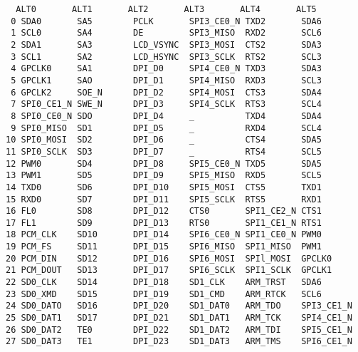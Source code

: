 \begingroup \fontsize{10pt}{10pt}
\selectfont
\begin{verbatim} 
  ALT0       ALT1       ALT2       ALT3       ALT4       ALT5      
 0 SDA0       SA5        PCLK       SPI3_CE0_N TXD2       SDA6      
 1 SCL0       SA4        DE         SPI3_MISO  RXD2       SCL6      
 2 SDA1       SA3        LCD_VSYNC  SPI3_MOSI  CTS2       SDA3      
 3 SCL1       SA2        LCD_HSYNC  SPI3_SCLK  RTS2       SCL3      
 4 GPCLK0     SA1        DPI_D0     SPI4_CE0_N TXD3       SDA3      
 5 GPCLK1     SAO        DPI_D1     SPI4_MISO  RXD3       SCL3      
 6 GPCLK2     SOE_N      DPI_D2     SPI4_MOSI  CTS3       SDA4      
 7 SPI0_CE1_N SWE_N      DPI_D3     SPI4_SCLK  RTS3       SCL4      
 8 SPI0_CE0_N SDO        DPI_D4     _          TXD4       SDA4      
 9 SPI0_MISO  SD1        DPI_D5     _          RXD4       SCL4      
10 SPI0_MOSI  SD2        DPI_D6     _          CTS4       SDA5      
11 SPI0_SCLK  SD3        DPI_D7     _          RTS4       SCL5      
12 PWM0       SD4        DPI_D8     SPI5_CE0_N TXD5       SDA5      
13 PWM1       SD5        DPI_D9     SPI5_MISO  RXD5       SCL5      
14 TXD0       SD6        DPI_D10    SPI5_MOSI  CTS5       TXD1      
15 RXD0       SD7        DPI_D11    SPI5_SCLK  RTS5       RXD1      
16 FL0        SD8        DPI_D12    CTS0       SPI1_CE2_N CTS1      
17 FL1        SD9        DPI_D13    RTS0       SPI1_CE1_N RTS1      
18 PCM_CLK    SD10       DPI_D14    SPI6_CE0_N SPI1_CE0_N PWM0      
19 PCM_FS     SD11       DPI_D15    SPI6_MISO  SPI1_MISO  PWM1      
20 PCM_DIN    SD12       DPI_D16    SPI6_MOSI  SPIl_MOSI  GPCLK0    
21 PCM_DOUT   SD13       DPI_D17    SPI6_SCLK  SPI1_SCLK  GPCLK1    
22 SD0_CLK    SD14       DPI_D18    SD1_CLK    ARM_TRST   SDA6      
23 SD0_XMD    SD15       DPI_D19    SD1_CMD    ARM_RTCK   SCL6      
24 SD0_DATO   SD16       DPI_D20    SD1_DAT0   ARM_TDO    SPI3_CE1_N
25 SD0_DAT1   SD17       DPI_D21    SD1_DAT1   ARM_TCK    SPI4_CE1_N
26 SD0_DAT2   TE0        DPI_D22    SD1_DAT2   ARM_TDI    SPI5_CE1_N
27 SD0_DAT3   TE1        DPI_D23    SD1_DAT3   ARM_TMS    SPI6_CE1_N
\end{verbatim}
\endgroup



